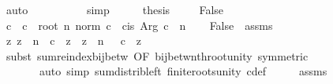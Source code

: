 \begin{isabellebody}
\ auto\isanewline
\ \ \isamarkupfalse%
\ \isamarkupfalse%
\ {\isachardoublequoteopen}{\isasymSum}{\isasymdots}\ {\isacharequal}{\kern0pt}\ {}{\isachardoublequoteclose}\ \isamarkupfalse%
\ simp\isanewline
\ \ \isamarkupfalse%
\ \isamarkupfalse%
\ {\isacharquery}{\kern0pt}thesis\ \isacommand{{\isachardot}{\kern0pt}}\isamarkupfalse%
\isanewline
{}\isamarkupfalse%
\isanewline
\ \ \isamarkupfalse%
\ False\isanewline
\ \ \isamarkupfalse%
\ c{\isacharprime}{\kern0pt}\ \ {\isachardoublequoteopen}c{\isacharprime}{\kern0pt}\ {\isacharequal}{\kern0pt}\ root\ n\ {\isacharparenleft}{\kern0pt}norm\ c{\isacharparenright}{\kern0pt}\ {\isacharasterisk}{\kern0pt}\ cis\ {\isacharparenleft}{\kern0pt}Arg\ c\ {\isacharslash}{\kern0pt}\ n{\isacharparenright}{\kern0pt}{\isachardoublequoteclose}\isanewline
\ \ \isamarkupfalse%
\ False\ \ assms\ \isamarkupfalse%
\ {\isachardoublequoteopen}{\isacharparenleft}{\kern0pt}{\isasymSum}{\isacharbraceleft}{\kern0pt}z{\isachardot}{\kern0pt}\ z\ {\isacharcircum}{\kern0pt}\ n\ {\isacharequal}{\kern0pt}\ c{\isacharbraceright}{\kern0pt}{\isacharparenright}{\kern0pt}\ {\isacharequal}{\kern0pt}\ {\isacharparenleft}{\kern0pt}{\isasymSum}z\ {\isacharbar}{\kern0pt}\ z\ {\isacharcircum}{\kern0pt}\ n\ {\isacharequal}{\kern0pt}\ {}{\isachardot}{\kern0pt}\ c{\isacharprime}{\kern0pt}\ {\isacharasterisk}{\kern0pt}\ z{\isacharparenright}{\kern0pt}{\isachardoublequoteclose}\isanewline
\ \ \ \ \isamarkupfalse%
\ {\isacharparenleft}{\kern0pt}subst\ sum{\isachardot}{\kern0pt}reindex{\isacharunderscore}{\kern0pt}bij{\isacharunderscore}{\kern0pt}betw\ {\isacharbrackleft}{\kern0pt}OF\ bij{\isacharunderscore}{\kern0pt}betw{\isacharunderscore}{\kern0pt}nth{\isacharunderscore}{\kern0pt}root{\isacharunderscore}{\kern0pt}unity{\isacharcomma}{\kern0pt}\ symmetric{\isacharbrackright}{\kern0pt}{\isacharparenright}{\kern0pt}\isanewline
\ \ \ \ \ \ \ {\isacharparenleft}{\kern0pt}auto\ simp{\isacharcolon}{\kern0pt}\ sum{\isacharunderscore}{\kern0pt}distrib{\isacharunderscore}{\kern0pt}left\ finite{\isacharunderscore}{\kern0pt}roots{\isacharunderscore}{\kern0pt}unity\ c{\isacharprime}{\kern0pt}{\isacharunderscore}{\kern0pt}def{\isacharparenright}{\kern0pt}\isanewline
\ \ \isamarkupfalse%
\ \isamarkupfalse%
\ assms\ \isamarkupfalse%
\ {\isachardoublequoteopen}{\isasymdots}\ {\isacharequal}{\kern0pt}\ {}{\isachardoublequoteclose}\isanewline

\end{isabellebody}
